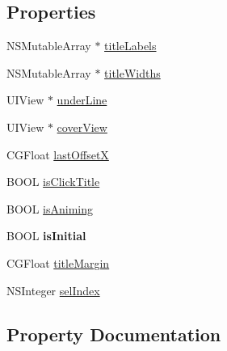 \subsection*{Properties}
\begin{DoxyCompactItemize}
\item 
N\+S\+Mutable\+Array $\ast$ \mbox{\hyperlink{category_y_z_display_view_controller_07_08_a05262cdecfa7cc258fbb1707b7bf928d}{title\+Labels}}
\item 
N\+S\+Mutable\+Array $\ast$ \mbox{\hyperlink{category_y_z_display_view_controller_07_08_adf592427b6a0738e1622627f17d4d69e}{title\+Widths}}
\item 
U\+I\+View $\ast$ \mbox{\hyperlink{category_y_z_display_view_controller_07_08_a1a4fd8e7a434c68db46a98c8bcbf91a8}{under\+Line}}
\item 
U\+I\+View $\ast$ \mbox{\hyperlink{category_y_z_display_view_controller_07_08_a3640eafeb765ad302c27ef93d74f1ecc}{cover\+View}}
\item 
C\+G\+Float \mbox{\hyperlink{category_y_z_display_view_controller_07_08_a37e7cf7e60e38511a7df90a2f7ad3f8d}{last\+OffsetX}}
\item 
B\+O\+OL \mbox{\hyperlink{category_y_z_display_view_controller_07_08_abf8edaa29e27090cfb08b25ba32e752f}{is\+Click\+Title}}
\item 
B\+O\+OL \mbox{\hyperlink{category_y_z_display_view_controller_07_08_acae88ec68f1fc1e28f5e2f90e28d5d07}{is\+Animing}}
\item 
\mbox{\label{category_y_z_display_view_controller_07_08_a7aaf71e3dfb6cf8d3124e284c433c277}} 
B\+O\+OL {\bfseries is\+Initial}
\item 
C\+G\+Float \mbox{\hyperlink{category_y_z_display_view_controller_07_08_a11ff2e30634daa2d530e887f2d9e4c64}{title\+Margin}}
\item 
N\+S\+Integer \mbox{\hyperlink{category_y_z_display_view_controller_07_08_a7ee6973f2a97140847647cb1819e7ab6}{sel\+Index}}
\end{DoxyCompactItemize}


\subsection{Property Documentation}
\mbox{\label{category_y_z_display_view_controller_07_08_a3640eafeb765ad302c27ef93d74f1ecc}} 
